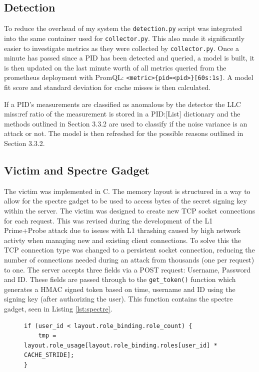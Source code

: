 \documentclass[11pt,a4paper, notitlepage]{article}
\begin{document}
\subsection{Detection}
To reduce the overhead of my system the \texttt{detection.py} script was integrated into the same container used for \texttt{collector.py}. This also made it
significantly easier to investigate metrics as they were collected by \texttt{collector.py}. 
Once a minute has passed since a PID has been detected and queried, a model is built, it is then updated on the last minute worth of all metrics queried 
from the prometheus deployment with PromQL: \texttt{<metric>\{pid=<pid>\}[60s:1s]}. A model fit score and standard deviation for cache misses is then calculated.

If a PID's measurements are classified as anomalous by the detector the LLC miss:ref ratio of the measurement is stored in a PID:[List] dictionary and 
the methods outlined in Section 3.3.2 are used to classify if the noise variance is an attack or not. The model is then refreshed for the possible reasons 
outlined in Section 3.3.2.

\subsection{Victim and Spectre Gadget}
The victim was implemented in C. The memory layout is structured in a way to allow for the spectre gadget to be used to access bytes of the secret signing
key within the server. 
The victim was designed to create new TCP socket connections for each request. This was revised during the development of the L1 Prime+Probe attack
due to issues with L1 thrashing caused by high network activty when managing new and existing client connections. To solve this the TCP connection type
was changed to a persistent socket connection, reducing the number of connections needed during an attack from thousands (one per request) to one.
The server accepts three fields via a POST request: Username, Password and ID. These fields are passed through to the \texttt{get\_token()} function  
which generates a HMAC signed token based on time, username and ID using the signing key (after authorizing the user). 
This function contains the spectre gadget, seen in Listing \ref{lst:spectre}.

\begin{figure}[H]
\begin{lstlisting}[style=customc, caption={\small{Spectre Gadget in victim.c}}, label={lst:spectre}]
if (user_id < layout.role_binding.role_count) {
    tmp = layout.role_usage[layout.role_binding.roles[user_id] * CACHE_STRIDE]; 
}
\end{lstlisting}
\end{figure}
\vspace{-0.5cm}
\end{document}
